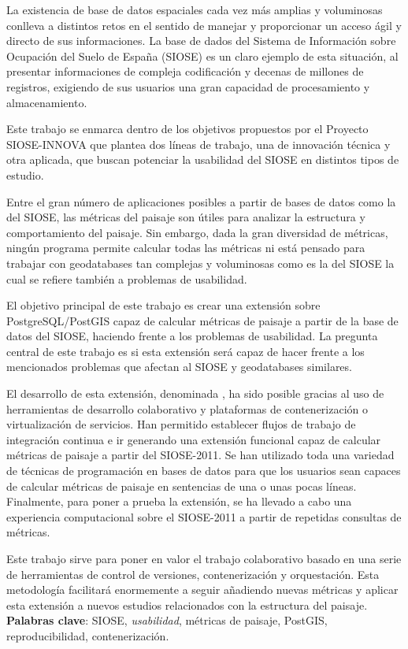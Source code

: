 
\begin{resumen}

La existencia de base de datos espaciales cada vez más amplias y voluminosas conlleva a distintos retos en el sentido de manejar y proporcionar un acceso ágil y directo de sus informaciones. La base de dados del Sistema de Información sobre Ocupación del Suelo de España (SIOSE) es un claro ejemplo de esta situación, al presentar informaciones de compleja codificación y decenas de millones de registros, exigiendo de sus usuarios una gran capacidad de procesamiento y almacenamiento.

Este trabajo se enmarca dentro de los objetivos propuestos por el Proyecto SIOSE-INNOVA que plantea dos líneas de trabajo, una de innovación técnica y otra aplicada, que buscan potenciar la usabilidad del SIOSE en distintos tipos de estudio.

Entre el gran número de aplicaciones posibles a partir de bases de datos como la del SIOSE, las métricas del paisaje son útiles para analizar la estructura y comportamiento del paisaje. Sin embargo, dada la gran diversidad de métricas, ningún programa permite calcular todas las métricas ni está pensado para trabajar con geodatabases tan complejas y voluminosas como es la del SIOSE la cual se refiere también a problemas de usabilidad.
 
El objetivo principal de este trabajo es crear una extensión sobre PostgreSQL/PostGIS capaz de calcular métricas de paisaje a partir de la base de datos del SIOSE, haciendo frente a los problemas de usabilidad. La pregunta central de este trabajo es si esta extensión será capaz de hacer frente a los mencionados problemas que afectan al SIOSE y geodatabases similares. 

El desarrollo de esta extensión, denominada \pgland{}, ha sido posible gracias al uso de herramientas de desarrollo colaborativo y plataformas de contenerización o virtualización de servicios. Han permitido establecer flujos de trabajo de integración continua e ir generando una extensión funcional capaz de calcular métricas de paisaje a partir del SIOSE-2011. Se han utilizado toda una variedad de técnicas de programación en bases de datos para que los usuarios sean capaces de calcular métricas de paisaje en sentencias de una o unas pocas líneas. Finalmente, para poner a prueba la extensión, se ha llevado a cabo una experiencia computacional sobre el SIOSE-2011 a partir de repetidas consultas de métricas. 

Este trabajo sirve para poner en valor el trabajo colaborativo basado en una serie de herramientas de control de versiones, contenerización y orquestación. Esta metodología facilitará enormemente a seguir añadiendo nuevas métricas y aplicar esta extensión a nuevos estudios relacionados con la estructura del paisaje.\\


\textbf{Palabras clave}: SIOSE, \textit{usabilidad}, métricas de paisaje, PostGIS, reproducibilidad, contenerización.


\end{resumen}
